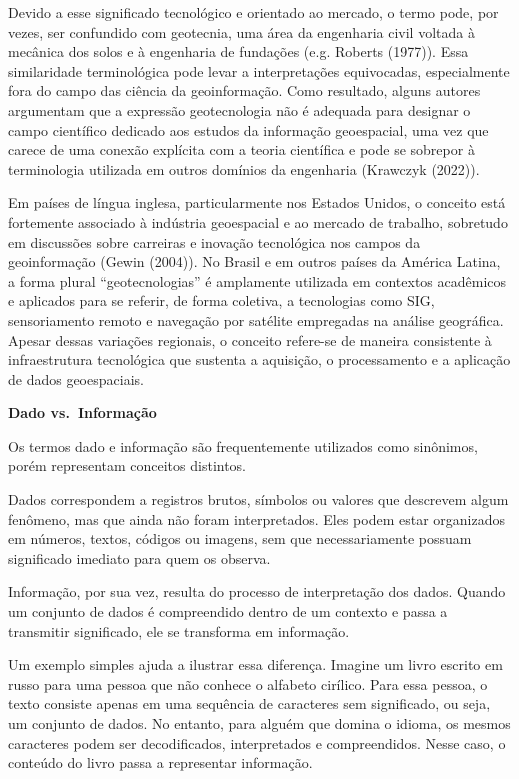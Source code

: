 \documentclass[
  letterpaper,
  DIV=11,
  numbers=noendperiod]{scrreprt}
\begin{document}
Devido a esse significado tecnológico e orientado ao mercado, o termo
pode, por vezes, ser confundido com geotecnia, uma área da engenharia
civil voltada à mecânica dos solos e à engenharia de fundações (e.g.
Roberts (1977)). Essa similaridade terminológica pode levar a
interpretações equivocadas, especialmente fora do campo das ciência da
geoinformação. Como resultado, alguns autores argumentam que a expressão
geotecnologia não é adequada para designar o campo científico dedicado
aos estudos da informação geoespacial, uma vez que carece de uma conexão
explícita com a teoria científica e pode se sobrepor à terminologia
utilizada em outros domínios da engenharia (Krawczyk (2022)).

Em países de língua inglesa, particularmente nos Estados Unidos, o
conceito está fortemente associado à indústria geoespacial e ao mercado
de trabalho, sobretudo em discussões sobre carreiras e inovação
tecnológica nos campos da geoinformação (Gewin (2004)). No Brasil e em
outros países da América Latina, a forma plural ``geotecnologias'' é
amplamente utilizada em contextos acadêmicos e aplicados para se
referir, de forma coletiva, a tecnologias como SIG, sensoriamento remoto
e navegação por satélite empregadas na análise geográfica. Apesar dessas
variações regionais, o conceito refere-se de maneira consistente à
infraestrutura tecnológica que sustenta a aquisição, o processamento e a
aplicação de dados geoespaciais.

\textbf{Dado vs.~Informação}

Os termos dado e informação são frequentemente utilizados como
sinônimos, porém representam conceitos distintos.

Dados correspondem a registros brutos, símbolos ou valores que descrevem
algum fenômeno, mas que ainda não foram interpretados. Eles podem estar
organizados em números, textos, códigos ou imagens, sem que
necessariamente possuam significado imediato para quem os observa.

Informação, por sua vez, resulta do processo de interpretação dos dados.
Quando um conjunto de dados é compreendido dentro de um contexto e passa
a transmitir significado, ele se transforma em informação.

Um exemplo simples ajuda a ilustrar essa diferença. Imagine um livro
escrito em russo para uma pessoa que não conhece o alfabeto cirílico.
Para essa pessoa, o texto consiste apenas em uma sequência de caracteres
sem significado, ou seja, um conjunto de dados. No entanto, para alguém
que domina o idioma, os mesmos caracteres podem ser decodificados,
interpretados e compreendidos. Nesse caso, o conteúdo do livro passa a
representar informação.
\end{document}
